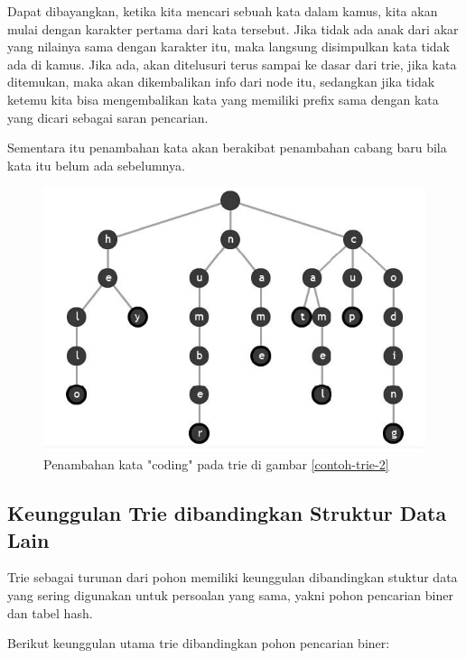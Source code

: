 Dapat dibayangkan, ketika kita mencari sebuah kata dalam kamus, kita akan mulai dengan karakter pertama dari kata tersebut. Jika tidak ada anak dari akar yang nilainya sama dengan karakter itu, maka langsung disimpulkan kata tidak ada di kamus. Jika ada, akan ditelusuri terus sampai ke dasar dari trie, jika kata ditemukan, maka akan dikembalikan info dari node itu, sedangkan jika tidak ketemu kita bisa mengembalikan kata yang memiliki prefix sama dengan kata yang dicari sebagai saran pencarian.

Sementara itu penambahan kata akan berakibat penambahan cabang baru bila kata itu belum ada sebelumnya.

\begin{figure}[H]
\centering
\includegraphics[scale=1.25]{Gambar/contoh-trie-3}
\caption[Penambahan kata "coding" pada trie di gambar \ref{contoh-trie-2}]{Penambahan kata "coding" pada trie di gambar \ref{contoh-trie-2}\cite{najogie:10:trie}} 
\label{contoh-trie-3}
\end{figure}

\subsection{Keunggulan Trie dibandingkan Struktur Data Lain}
\label{sec:keunggulanTrie}

Trie sebagai turunan dari pohon memiliki keunggulan dibandingkan stuktur data yang sering digunakan untuk persoalan yang sama, yakni pohon pencarian biner dan tabel hash.

Berikut keunggulan utama trie dibandingkan pohon pencarian biner:

